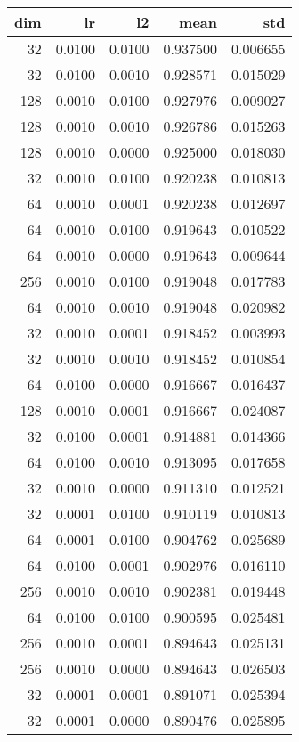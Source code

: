 \begin{tabular}{rrrrr}
\toprule
 dim &      lr &      l2 &      mean &       std \\
\midrule
  32 &  0.0100 &  0.0100 &  0.937500 &  0.006655 \\
  32 &  0.0100 &  0.0010 &  0.928571 &  0.015029 \\
 128 &  0.0010 &  0.0100 &  0.927976 &  0.009027 \\
 128 &  0.0010 &  0.0010 &  0.926786 &  0.015263 \\
 128 &  0.0010 &  0.0000 &  0.925000 &  0.018030 \\
  32 &  0.0010 &  0.0100 &  0.920238 &  0.010813 \\
  64 &  0.0010 &  0.0001 &  0.920238 &  0.012697 \\
  64 &  0.0010 &  0.0100 &  0.919643 &  0.010522 \\
  64 &  0.0010 &  0.0000 &  0.919643 &  0.009644 \\
 256 &  0.0010 &  0.0100 &  0.919048 &  0.017783 \\
  64 &  0.0010 &  0.0010 &  0.919048 &  0.020982 \\
  32 &  0.0010 &  0.0001 &  0.918452 &  0.003993 \\
  32 &  0.0010 &  0.0010 &  0.918452 &  0.010854 \\
  64 &  0.0100 &  0.0000 &  0.916667 &  0.016437 \\
 128 &  0.0010 &  0.0001 &  0.916667 &  0.024087 \\
  32 &  0.0100 &  0.0001 &  0.914881 &  0.014366 \\
  64 &  0.0100 &  0.0010 &  0.913095 &  0.017658 \\
  32 &  0.0010 &  0.0000 &  0.911310 &  0.012521 \\
  32 &  0.0001 &  0.0100 &  0.910119 &  0.010813 \\
  64 &  0.0001 &  0.0100 &  0.904762 &  0.025689 \\
  64 &  0.0100 &  0.0001 &  0.902976 &  0.016110 \\
 256 &  0.0010 &  0.0010 &  0.902381 &  0.019448 \\
  64 &  0.0100 &  0.0100 &  0.900595 &  0.025481 \\
 256 &  0.0010 &  0.0001 &  0.894643 &  0.025131 \\
 256 &  0.0010 &  0.0000 &  0.894643 &  0.026503 \\
  32 &  0.0001 &  0.0001 &  0.891071 &  0.025394 \\
  32 &  0.0001 &  0.0000 &  0.890476 &  0.025895 \\

\end{tabular}
